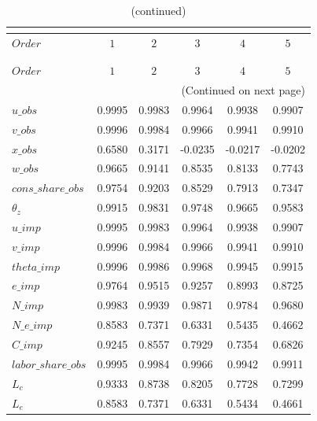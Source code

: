  
\begin{center}
\begin{longtable}{lccccc} 
\caption{COEFFICIENTS OF AUTOCORRELATION}\\
 \label{Table:th_autocorr_matrix}\\
\toprule 
$Order              $	 & 	 $         1$	 & 	 $         2$	 & 	 $         3$	 & 	 $         4$	 & 	 $         5$\\
\midrule \endfirsthead 
\caption{(continued)}\\
 \toprule \\ 
$Order              $	 & 	 $         1$	 & 	 $         2$	 & 	 $         3$	 & 	 $         4$	 & 	 $         5$\\
\midrule \endhead 
\midrule \multicolumn{6}{r}{(Continued on next page)} \\ \bottomrule \endfoot 
\bottomrule \endlastfoot 
$u\_obs             $	 & 	    0.9995	 & 	    0.9983	 & 	    0.9964	 & 	    0.9938	 & 	    0.9907 \\ 
$v\_obs             $	 & 	    0.9996	 & 	    0.9984	 & 	    0.9966	 & 	    0.9941	 & 	    0.9910 \\ 
$x\_obs             $	 & 	    0.6580	 & 	    0.3171	 & 	   -0.0235	 & 	   -0.0217	 & 	   -0.0202 \\ 
$w\_obs             $	 & 	    0.9665	 & 	    0.9141	 & 	    0.8535	 & 	    0.8133	 & 	    0.7743 \\ 
$cons\_share\_obs   $	 & 	    0.9754	 & 	    0.9203	 & 	    0.8529	 & 	    0.7913	 & 	    0.7347 \\ 
${\theta_z}         $	 & 	    0.9915	 & 	    0.9831	 & 	    0.9748	 & 	    0.9665	 & 	    0.9583 \\ 
$u\_imp             $	 & 	    0.9995	 & 	    0.9983	 & 	    0.9964	 & 	    0.9938	 & 	    0.9907 \\ 
$v\_imp             $	 & 	    0.9996	 & 	    0.9984	 & 	    0.9966	 & 	    0.9941	 & 	    0.9910 \\ 
$theta\_imp         $	 & 	    0.9996	 & 	    0.9986	 & 	    0.9968	 & 	    0.9945	 & 	    0.9915 \\ 
$e\_imp             $	 & 	    0.9764	 & 	    0.9515	 & 	    0.9257	 & 	    0.8993	 & 	    0.8725 \\ 
$N\_imp             $	 & 	    0.9983	 & 	    0.9939	 & 	    0.9871	 & 	    0.9784	 & 	    0.9680 \\ 
$N\_e\_imp          $	 & 	    0.8583	 & 	    0.7371	 & 	    0.6331	 & 	    0.5435	 & 	    0.4662 \\ 
$C\_imp             $	 & 	    0.9245	 & 	    0.8557	 & 	    0.7929	 & 	    0.7354	 & 	    0.6826 \\ 
$labor\_share\_obs  $	 & 	    0.9995	 & 	    0.9984	 & 	    0.9966	 & 	    0.9942	 & 	    0.9911 \\ 
${L_c}              $	 & 	    0.9333	 & 	    0.8738	 & 	    0.8205	 & 	    0.7728	 & 	    0.7299 \\ 
${L_e}              $	 & 	    0.8583	 & 	    0.7371	 & 	    0.6331	 & 	    0.5434	 & 	    0.4661 \\ 
\end{longtable}
 \end{center}
